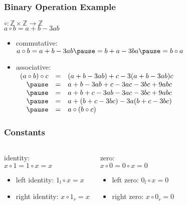 \documentclass[dvipsnames]{beamer}
\begin{document}
\begin{frame}
  \frametitle{Binary Operation Example}

  \begin{example}
    $\circ: \mathbb{Z} \times \mathbb{Z} \rightarrow \mathbb{Z}$\\
    $a \circ b = a + b - 3ab$

    \pause
    \medskip
    \begin{itemize}
      \item commutative:\\
        $a \circ b = a + b - 3ab \pause
                   = b + a - 3ba \pause
                   = b \circ a$

      \pause
      \medskip
      \item associative:\\
        $\begin{array}{rcl}
          (a \circ b) \circ c & = & (a + b - 3ab) + c - 3 (a + b - 3ab) c\\ \pause
                              & = & a + b - 3ab + c - 3ac - 3bc + 9abc\\ \pause
                              & = & a + b + c - 3ab - 3ac - 3bc + 9abc\\ \pause
                              & = & a + (b + c - 3bc) - 3 a (b + c - 3bc)\\ \pause
                              & = & a \circ (b \circ c)
        \end{array}$
     \end{itemize}
 \end{example}
\end{frame}

\begin{frame}
  \frametitle{Constants}

  \begin{columns}
    \begin{definition}
      \alert{identity}:\\
      $x \circ 1 = 1 \circ x = x$

      \begin{itemize}
        \item left identity: $1_l \circ x = x$
        \item right identity: $x \circ 1_r = x$
      \end{itemize}
    \end{definition}

    \pause
    \begin{definition}
      \alert{zero}:\\
      $x \circ 0 = 0 \circ x = 0$

      \begin{itemize}
        \item left zero: $0_l \circ x = 0$
        \item right zero: $x \circ 0_r = 0$
      \end{itemize}
    \end{definition}
  \end{columns}
\end{frame}
\end{document}
